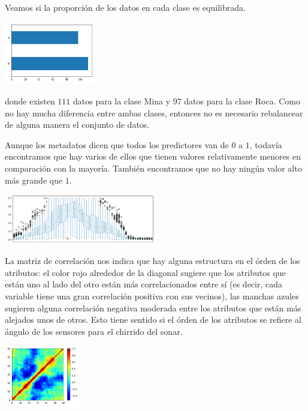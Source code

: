 \documentclass[letterpaper,11pt]{article}
\begin{document}
\begin{enumerate}
    Veamos si la proporción de los datos en cada clase es equilibrada.
    \begin{center}
        \includegraphics[width=0.3\textwidth]{imagenes/sonar-equilibrio.png}
    \end{center}

    donde existen $111$ datos para la clase Mina y $97$ datos para la clase 
    Roca. Como no hay mucha diferencia entre ambas clases, entonces no es 
    necesario rebalancear de alguna manera el conjunto de datos. 

    Aunque los metadatos dicen que todos los predictores van de $0$ a $1$, 
    todavía encontramos que hay varios de ellos que tienen valores relativamente
    menores en comparación con la mayoría. También encontramos que no hay
    ningún valor alto más grande que $1$.
    \begin{center}
        \includegraphics[width=0.5\textwidth]{imagenes/sonar-boxes.png}
    \end{center}

    La matriz de correlación nos indica que hay alguna estructura en el órden 
    de los atributos: el color rojo alrededor de la diagonal sugiere que los 
    atributos que están uno al lado del otro están más correlacionados entre 
    sí (es decir, cada variable tiene una gran correlación positiva con sus 
    vecinos), las manchas azules sugieren alguna correlación negativa moderada 
    entre los atributos que están más alejados unos de otros. Esto tiene 
    sentido si el órden de los atributos se refiere al ángulo de los sensores 
    para el chirrido del sonar.
    \begin{center}
        \includegraphics[width=0.25\textwidth]{imagenes/sonar-correlacion.png}
    \end{center}


\end{enumerate}
\end{document}
